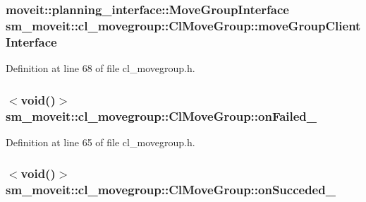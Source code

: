 \subsubsection[{\texorpdfstring{move\+Group\+Client\+Interface}{moveGroupClientInterface}}]{\setlength{\rightskip}{0pt plus 5cm}moveit\+::planning\+\_\+interface\+::\+Move\+Group\+Interface sm\+\_\+moveit\+::cl\+\_\+movegroup\+::\+Cl\+Move\+Group\+::move\+Group\+Client\+Interface}\hypertarget{classsm__moveit_1_1cl__movegroup_1_1ClMoveGroup_a23acf6883455566dbab30e4367c2144d}{}\label{classsm__moveit_1_1cl__movegroup_1_1ClMoveGroup_a23acf6883455566dbab30e4367c2144d}


Definition at line 68 of file cl\+\_\+movegroup.\+h.

\subsubsection[{\texorpdfstring{on\+Failed\+\_\+}{onFailed_}}]{$<$void()$>$ sm\+\_\+moveit\+::cl\+\_\+movegroup\+::\+Cl\+Move\+Group\+::on\+Failed\+\_\+\hspace{0.3cm}{\ttfamily [private]}}\hypertarget{classsm__moveit_1_1cl__movegroup_1_1ClMoveGroup_ab4d03a5e64608a13458d740ce1536c8e}{}\label{classsm__moveit_1_1cl__movegroup_1_1ClMoveGroup_ab4d03a5e64608a13458d740ce1536c8e}


Definition at line 65 of file cl\+\_\+movegroup.\+h.

\subsubsection[{\texorpdfstring{on\+Succeded\+\_\+}{onSucceded_}}]{$<$void()$>$ sm\+\_\+moveit\+::cl\+\_\+movegroup\+::\+Cl\+Move\+Group\+::on\+Succeded\+\_\+\hspace{0.3cm}{\ttfamily [private]}}\hypertarget{classsm__moveit_1_1cl__movegroup_1_1ClMoveGroup_ad0a02fb564967bae0808c966dd1e3c36}{}\label{classsm__moveit_1_1cl__movegroup_1_1ClMoveGroup_ad0a02fb564967bae0808c966dd1e3c36}


